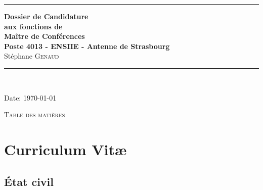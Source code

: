 \documentclass[11pt]{article}
\begin{document}
\thispagestyle{empty}




\rule{\linewidth}{1mm}
\begin{center}
\Large{\textbf{Dossier de Candidature\\
aux fonctions de \\
Maître de Conférences\\
Poste 4013 - ENSIIE - Antenne de Strasbourg}}\\[5mm]
\Large{Stéphane \textsc{Genaud}}\\[1cm]

\rule{\linewidth}{1mm}
\\
\vspace{3cm}
\end{center}
\begin{center}
Date: \today\\
\end{center}

\newpage
\mbox{}%

\setlength{\parindent}{5mm} %
\setlength{\parindent}{0mm}
\newpage


\begin{center}
\huge{\textsc{Table des matières}}
\end{center}
\vspace{2cm}


\tableofcontents

\noindent


\newpage



\section{Curriculum Vit{\ae}}

\setlength{\tabcolsep}{5pt}

\subsection{\'Etat civil}

\medskip
\end{document}
